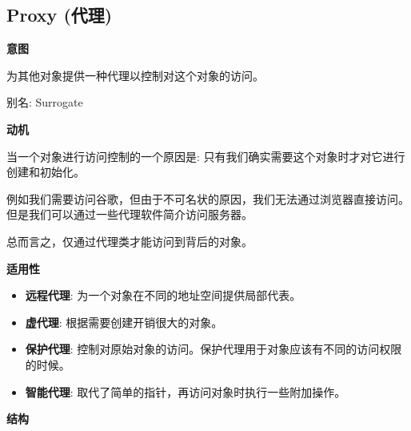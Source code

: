\subsection{Proxy (代理)}

\noindent\textbf{意图}

为其他对象提供一种代理以控制对这个对象的访问。

别名: Surrogate

\noindent\textbf{动机}

当一个对象进行访问控制的一个原因是: 只有我们确实需要这个对象时才对它进行创建和初始化。

例如我们需要访问谷歌，但由于不可名状的原因，我们无法通过浏览器直接访问。但是我们可以通过一些代理软件简介访问服务器。

总而言之，仅通过代理类才能访问到背后的对象。

\noindent\textbf{适用性}

\begin{itemize}
    \item \textbf{远程代理}: 为一个对象在不同的地址空间提供局部代表。
    \item \textbf{虚代理}: 根据需要创建开销很大的对象。
    \item \textbf{保护代理}: 控制对原始对象的访问。保护代理用于对象应该有不同的访问权限的时候。
    \item \textbf{智能代理}: 取代了简单的指针，再访问对象时执行一些附加操作。
\end{itemize}

\noindent\textbf{结构}

\begin{figure}[H]
    \scriptsize
    \centering
\end{figure}

